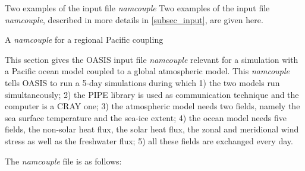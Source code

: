 \newpage
\begin{section}{Two examples of the input file {\em namcouple}}
\label{app_namcouple}
Two examples of the input file {\em namcouple}, described in more details
in \ref{subsec_input}, are given here.

\begin{subsection}{A {\em namcouple} for a regional Pacific coupling}

This section gives the OASIS input file {\em namcouple} relevant
for a simulation with a Pacific ocean model coupled to a global 
atmospheric model. This {\em namcouple}
tells OASIS to run a 5-day simulations during which
1) the two models run simultaneously; 2) the PIPE library is used 
as communication technique and the computer is a CRAY one; 3) the 
atmospheric model needs two fields, namely the sea surface 
temperature and the sea-ice extent; 4) the ocean model needs five fields,     
the non-solar heat flux, the solar heat flux, the zonal and meridional wind
stress as well as the freshwater flux; 5) all these fields are exchanged
every day.

The {\em namcouple} file is as follows:
\begin{verbatim}


\end{verbatim}
\end{subsection}
\end{section}
